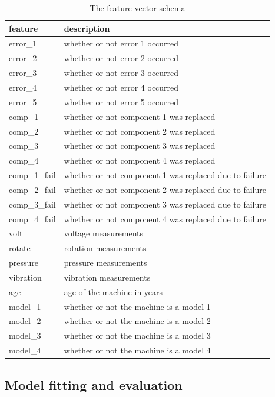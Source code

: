 \documentclass{article}
\begin{document}
\begin{table}[!ht]
\centering
\caption{The feature vector schema}
\label{tab:feature-vector}
\begin{tabular}{ll}
\toprule
feature & description\\
\midrule
error\_1		& whether or not error 1 occurred\\
error\_2		& whether or not error 2 occurred\\
error\_3		& whether or not error 3 occurred\\
error\_4		& whether or not error 4 occurred\\
error\_5		& whether or not error 5 occurred\\
comp\_1		& whether or not component 1 was replaced\\
comp\_2		& whether or not component 2 was replaced\\
comp\_3		& whether or not component 3 was replaced\\
comp\_4		& whether or not component 4 was replaced\\
comp\_1\_fail	& whether or not component 1 was replaced due to failure\\
comp\_2\_fail	& whether or not component 2 was replaced due to failure\\
comp\_3\_fail	& whether or not component 3 was replaced due to failure\\
comp\_4\_fail	& whether or not component 4 was replaced due to failure\\
volt			& voltage measurements\\
rotate		& rotation measurements\\
pressure		& pressure measurements\\ 
vibration		& vibration measurements\\
age			& age of the machine in years\\
model\_1		& whether or not the machine is a model 1\\
model\_2		& whether or not the machine is a model 2\\
model\_3		& whether or not the machine is a model 3\\
model\_4		& whether or not the machine is a model 4\\
\bottomrule
\end{tabular}
\end{table}

\subsection{Model fitting and evaluation}
\end{document}
